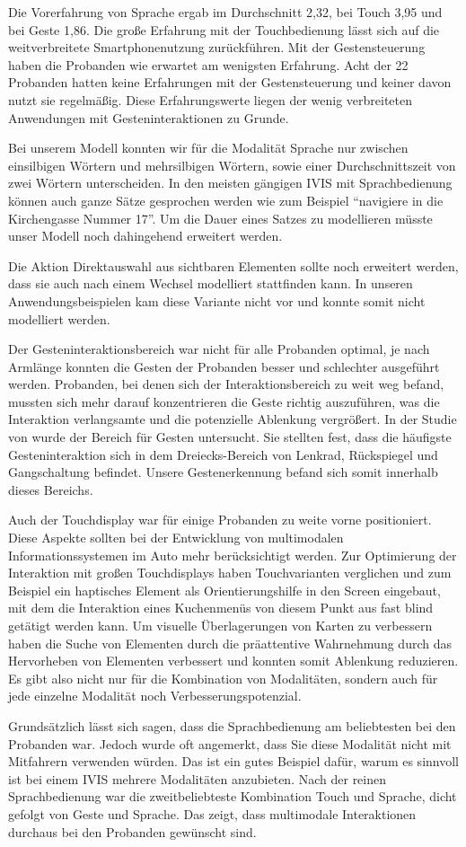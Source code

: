 Die Vorerfahrung von Sprache ergab im Durchschnitt 2,32, bei Touch 3,95 und bei Geste 1,86. Die große Erfahrung mit der Touchbedienung lässt sich auf die weitverbreitete Smartphonenutzung zurückführen. Mit der Gestensteuerung haben die Probanden wie erwartet am wenigsten Erfahrung. Acht der 22 Probanden hatten keine Erfahrungen mit der Gestensteuerung und keiner davon nutzt sie regelmäßig. Diese Erfahrungswerte liegen der wenig verbreiteten Anwendungen mit Gesteninteraktionen zu Grunde.

Bei unserem Modell konnten wir für die Modalität Sprache nur zwischen einsilbigen Wörtern und mehrsilbigen Wörtern, sowie einer Durchschnittszeit von zwei Wörtern unterscheiden. In den meisten gängigen IVIS mit Sprachbedienung können auch ganze Sätze gesprochen werden wie zum Beispiel "`navigiere in die Kirchengasse Nummer 17"'. Um die Dauer eines Satzes zu modellieren müsste unser Modell noch dahingehend erweitert werden. 

Die Aktion Direktauswahl aus sichtbaren Elementen sollte noch erweitert werden, dass sie auch nach einem Wechsel modelliert stattfinden kann. In unseren Anwendungsbeispielen kam diese Variante nicht vor und konnte somit nicht modelliert werden.

Der Gesteninteraktionsbereich war nicht für alle Probanden optimal, je nach Armlänge konnten die Gesten der Probanden besser und schlechter ausgeführt werden. Probanden, bei denen sich der Interaktionsbereich zu weit weg befand, mussten sich mehr darauf konzentrieren die Geste richtig auszuführen, was die Interaktion verlangsamte und die potenzielle Ablenkung vergrößert. In der Studie von \citet{Riener:2013:SIG} wurde der Bereich für Gesten untersucht. 
Sie stellten fest, dass die häufigste Gesteninteraktion sich in dem Dreiecks-Bereich von Lenkrad, Rückspiegel und Gangschaltung befindet. 
Unsere Gestenerkennung befand sich somit innerhalb dieses Bereichs.

Auch der Touchdisplay war für einige Probanden zu weite vorne positioniert. Diese Aspekte sollten bei der Entwicklung von multimodalen Informationssystemen im Auto mehr berücksichtigt werden. Zur Optimierung der Interaktion mit großen Touchdisplays haben \citet{Rumelin:2013} Touchvarianten verglichen und zum Beispiel ein haptisches Element als Orientierungshilfe in den Screen eingebaut, mit dem die Interaktion eines Kuchenmenüs von diesem Punkt aus fast blind getätigt werden kann. Um visuelle Überlagerungen von Karten zu verbessern haben \citet{lee2013saliency} die Suche von Elementen durch die präattentive Wahrnehmung durch das Hervorheben von Elementen verbessert und konnten somit Ablenkung reduzieren. Es gibt also nicht nur für die Kombination von Modalitäten, sondern auch für jede einzelne Modalität noch Verbesserungspotenzial. 

Grundsätzlich lässt sich sagen, dass die Sprachbedienung am beliebtesten bei den Probanden war. Jedoch wurde oft angemerkt, dass Sie diese Modalität nicht mit Mitfahrern verwenden würden. Das ist ein gutes Beispiel dafür, warum es sinnvoll ist bei einem IVIS mehrere Modalitäten anzubieten. Nach der reinen Sprachbedienung war die zweitbeliebteste Kombination Touch und Sprache, dicht gefolgt von Geste und Sprache. Das zeigt, dass multimodale Interaktionen durchaus bei den Probanden gewünscht sind. 